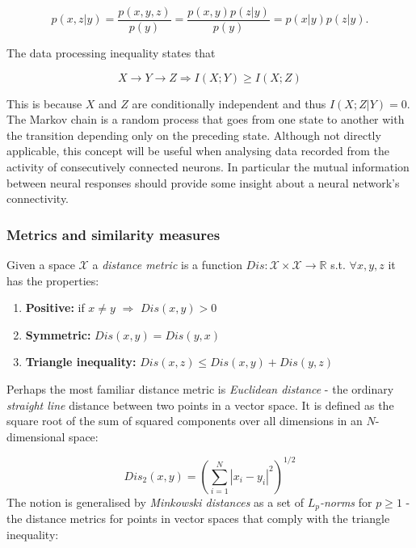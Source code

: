 \documentclass[12pt]{extarticle}
\begin{document}
\begin{equation}
p(x,z|y) = \frac{p(x,y,z)}{p(y)} = \frac{p(x,y)p(z|y)}{p(y)} = p(x|y)p(z|y).
\end{equation}

\noindent
The data processing inequality states that

\begin{equation}
X \rightarrow Y \rightarrow Z \Rightarrow I(X;Y)\geq I(X;Z)
\end{equation}

\noindent
This is because $X$ and $Z$ are conditionally independent and thus
$I(X;Z|Y)=0$. The Markov chain is a random process that goes from one
state to another with the transition depending only on the preceding
state. Although not directly applicable, this concept will be useful
when analysing data recorded from the activity of consecutively
connected neurons. In particular the mutual information between neural
responses should provide some insight about a neural network's
connectivity.\\


\subsubsection*{Metrics and similarity measures}

\noindent
Given a space $\mathcal{X}$ a \textit{distance metric} is a function
$Dis:\mathcal{X}\times\mathcal{X}\rightarrow\mathbb{R}$ s.t. $\forall
x,y,z$ it has the properties:

\begin{enumerate}
\item \textbf{Positive:  }if $x\neq y$ $\Rightarrow$ $Dis(x,y)>0$
\item \textbf{Symmetric: }$Dis(x,y) = Dis(y,x)$
\item \textbf{Triangle inequality: }$Dis(x,z) \leq Dis(x,y) + Dis(y,z)$
\end{enumerate}

\noindent 
Perhaps the most familiar distance metric is \textit{Euclidean
  distance} - the ordinary \textit{straight line} distance between two
points in a vector space. It is defined as the square root of the sum
of squared components over all dimensions in an $N$-dimensional space:

\begin{equation}
Dis_2 (x,y) = \left(\sum_{i=1}^{N} |x_i - y_i|^2\right)^{1/2}
\end{equation}
The notion is generalised by \textit{Minkowski distances} as a set of $L_p$\textit{-norms} for $p\geq1$ - the distance metrics for points in vector spaces that comply with the triangle inequality:
\end{document}
